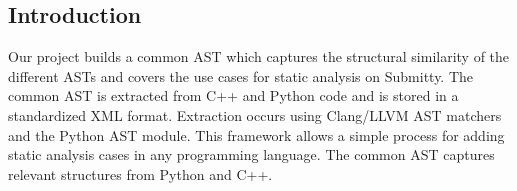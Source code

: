 \documentclass[thesis]{hmcposter}
\begin{document}
\begin{poster}
\section{Introduction}
Our project builds a common AST which captures the structural similarity of the different ASTs and covers the use cases for static analysis on Submitty. The common AST is extracted from C++ and Python code and is stored in a standardized XML format. Extraction occurs using Clang/LLVM AST matchers and the Python AST module. This framework allows a simple process for adding static analysis cases in any programming language. 
The common AST captures relevant structures from Python and C++. 

\vspace{0.3in}
\begin{figure}
\begin{center}
\end{center}
\end{figure}
\vspace{0.3in}


\end{poster}
\end{document}
